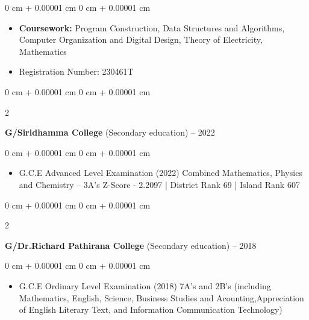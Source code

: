 \documentclass[10pt, letterpaper]{article}
\newenvironment{highlights}{
    \begin{itemize}[
        topsep=0.10 cm,
        parsep=0.10 cm,
        partopsep=0pt,
        itemsep=0pt,
        leftmargin=0 cm + 10pt
    ]
}{
    \end{itemize}
} %
\newenvironment{onecolentry}{
    \begin{adjustwidth}{
        0 cm + 0.00001 cm
    }{
        0 cm + 0.00001 cm
    }
}{
    \end{adjustwidth}
} %
\newenvironment{twocolentry}[2][]{
    \onecolentry
    \def\secondColumn{#2}
    \setcolumnwidth{\fill, 4.5 cm}
    \begin{paracol}{2}
}{
    \switchcolumn \raggedleft \secondColumn
    \end{paracol}
    \endonecolentry
} %
\begin{document}
        \vspace{0.10 cm}
        \begin{onecolentry}
            \begin{highlights}
                \item \textbf{Coursework:} Program Construction, Data Structures and Algorithms, Computer Organization and Digital Design, Theory of Electricity, Mathematics
                \item Registration Number: 230461T
            \end{highlights}
        \end{onecolentry}
        \vspace{0.30 cm}
        \begin{twocolentry}{
            2019 – 2022 
        }
            \textbf{G/Siridhamma College} (Secondary education)\end{twocolentry}

        \vspace{0.10 cm}
        \begin{onecolentry}
            \begin{highlights}
                \item G.C.E Advanced Level Examination (2022)
                Combined Mathematics, Physics and Chemistry – 3A's
                Z-Score - 2.2097 | District Rank 69 | Island Rank 607
            \end{highlights}
        \end{onecolentry}
        \vspace{0.30 cm}
        \begin{twocolentry}{
            2009 – 2018
        }
            \textbf{G/Dr.Richard Pathirana College} (Secondary education)\end{twocolentry}

        \vspace{0.10 cm}
        \begin{onecolentry}
            \begin{highlights}
                \item G.C.E Ordinary Level Examination (2018)
                7A's and 2B's (including Mathematics, English, Science, Business Studies and Acounting,Appreciation of English Literary Text, and Information Communication Technology)
            \end{highlights}
        \end{onecolentry}
\end{document}
